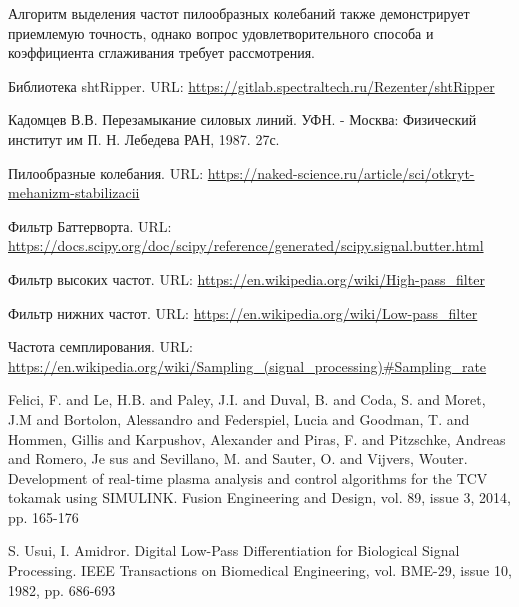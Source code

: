 \documentclass[12pt,a4paper]{article}
\begin{document}
 	Алгоритм выделения частот пилообразных колебаний также демонстрирует приемлемую точность, однако вопрос удовлетворительного способа и коэффициента сглаживания требует рассмотрения.
 	
 	\newpage
 	\begin{flushleft}
		\begin{thebibliography}{1}
			
			 Библиотека shtRipper. URL: \url{https://gitlab.spectraltech.ru/Rezenter/shtRipper}

			 Кадомцев В.В. Перезамыкание силовых линий. УФН. - Москва: Физический институт им П. Н. Лебедева РАН, 1987. 27с.
						
			 Пилообразные колебания.  URL: \url{https://naked-science.ru/article/sci/otkryt-mehanizm-stabilizacii}
			
			 Фильтр Баттерворта. URL: \url{https://docs.scipy.org/doc/scipy/reference/generated/scipy.signal.butter.html}

			 Фильтр высоких частот. URL: \url{https://en.wikipedia.org/wiki/High-pass_filter}

			 Фильтр нижних частот. URL: \url{https://en.wikipedia.org/wiki/Low-pass_filter}
						
			 Частота семплирования. URL: \url{https://en.wikipedia.org/wiki/Sampling_(signal_processing)#Sampling_rate}
			
			 Felici, F. and Le, H.B. and Paley, J.I. and Duval, B. and Coda, S. and Moret, J.M and Bortolon, Alessandro and Federspiel, Lucia and Goodman, T. and Hommen, Gillis and Karpushov, Alexander and Piras, F. and Pitzschke, Andreas and Romero, Je sus and Sevillano, M. and Sauter, O. and Vijvers, Wouter. Development of real-time plasma analysis and control algorithms for the TCV tokamak using SIMULINK. Fusion Engineering and Design, vol. 89, issue 3, 2014, pp. 165-176
			
			 S. Usui, I. Amidror. Digital Low-Pass Differentiation for Biological Signal Processing. IEEE Transactions on Biomedical Engineering, vol. BME-29, issue 10, 1982, pp. 686-693
			
			
						
			\end{thebibliography}
	\end{flushleft}
\end{document}
